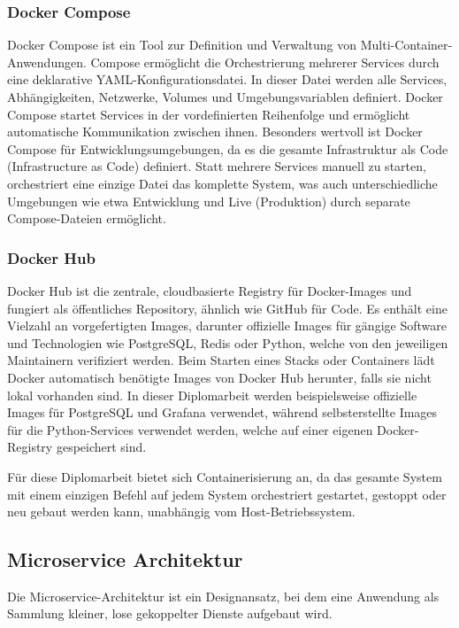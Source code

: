 \newpage
\subsubsection{Docker Compose}
\label{sec:docker_compose}
Docker Compose ist ein Tool zur Definition und Verwaltung von Multi-Container-Anwendungen.
Compose ermöglicht die Orchestrierung mehrerer Services durch eine deklarative YAML-Konfigurationsdatei.
In dieser Datei werden alle Services, Abhängigkeiten, Netzwerke, Volumes und Umgebungsvariablen definiert.
Docker Compose startet Services in der vordefinierten Reihenfolge und ermöglicht automatische Kommunikation zwischen ihnen.
Besonders wertvoll ist Docker Compose für Entwicklungsumgebungen, da es die gesamte Infrastruktur als Code (Infrastructure as Code) definiert.
Statt mehrere Services manuell zu starten, orchestriert eine einzige Datei das komplette System, was auch unterschiedliche Umgebungen wie etwa Entwicklung und Live (Produktion) durch separate Compose-Dateien ermöglicht. \cite{docker_compose}

\subsubsection{Docker Hub}
Docker Hub ist die zentrale, cloudbasierte Registry für Docker-Images und fungiert als öffentliches Repository, ähnlich wie GitHub für Code.
Es enthält eine Vielzahl an vorgefertigten Images, darunter offizielle Images für gängige Software und Technologien wie PostgreSQL, Redis oder Python, welche von den jeweiligen Maintainern verifiziert werden. \cite{docker_hub}
Beim Starten eines Stacks oder Containers lädt Docker automatisch benötigte Images von Docker Hub herunter, falls sie nicht lokal vorhanden sind.
In dieser Diplomarbeit werden beispielsweise offizielle Images für PostgreSQL und Grafana verwendet, während selbsterstellte Images für die Python-Services verwendet werden, welche auf einer eigenen Docker-Registry gespeichert sind.

Für diese Diplomarbeit bietet sich Containerisierung an, da das gesamte System mit einem einzigen Befehl auf jedem System orchestriert gestartet, gestoppt oder neu gebaut werden kann, unabhängig vom Host-Betriebssystem.

\newpage
\subsection{Microservice Architektur}
\label{sec:microservices}

Die Microservice-Architektur ist ein Designansatz, bei dem eine Anwendung als Sammlung kleiner, lose gekoppelter Dienste aufgebaut wird.

